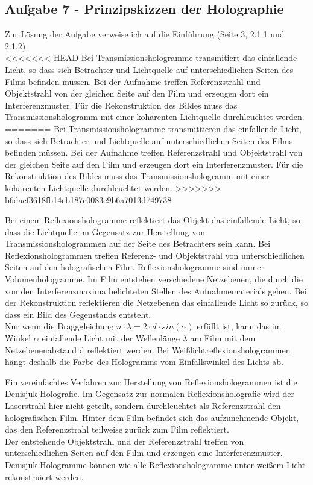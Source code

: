 \subsection*{Aufgabe 7 - Prinzipskizzen der Holographie}
Zur Lösung der Aufgabe verweise ich auf die Einführung (Seite 3, 2.1.1 und 2.1.2). \\
<<<<<<< HEAD
Bei Transmissionshologramme transmitiert das einfallende Licht, so dass sich Betrachter und Lichtquelle auf unterschiedlichen Seiten des Films befinden müssen. Bei der Aufnahme treffen Referenzstrahl und Objektstrahl von der gleichen Seite auf den Film und erzeugen dort ein Interferenzmuster. Für die Rekonstruktion des Bildes muss das Transmissionshologramm mit einer kohärenten Lichtquelle durchleuchtet werden.
=======
Bei Transmissionshologramme transmittieren das einfallende Licht, so dass sich Betrachter und Lichtquelle auf unterschiedlichen Seiten des Films befinden müssen. Bei der Aufnahme treffen Referenzstrahl und Objektstrahl von der gleichen Seite auf den Film und erzeugen dort ein Interferenzmuster. Für die Rekonstruktion des Bildes muss das Transmissionshologramm mit einer kohärenten Lichtquelle durchleuchtet werden.
>>>>>>> b6dacf3618fb14eb187c0083e9b6a7013d749738


Bei einem Reflexionshologramme reflektiert das Objekt das einfallende Licht, so dass die Lichtquelle im Gegensatz zur Herstellung von Transmissionshologrammen auf der Seite des Betrachters sein kann. Bei Reflexionshologrammen treffen Referenz- und Objektstrahl von unterschiedlichen Seiten auf den holografischen Film. Reflexionshologramme sind immer Volumenhologramme. Im Film entstehen verschiedene Netzebenen, die durch die von den Interferenzmaxima belichteten Stellen des Aufnahmematerials gehen. Bei der Rekonstruktion reflektieren die Netzebenen das einfallende Licht so zurück, so dass ein Bild des Gegenstands entsteht.\\
Nur wenn die Bragggleichung $n \cdot \lambda = 2 \cdot d \cdot sin \left( \alpha \right)$ erfüllt ist, kann das im Winkel $\alpha$ einfallende Licht mit der Wellenlänge $\lambda$ am Film mit dem Netzebenenabstand d reflektiert werden. Bei Weißlichtreflexionshologrammen hängt deshalb die Farbe des Hologramms vom Einfallswinkel des Lichts ab.


Ein vereinfachtes Verfahren zur Herstellung von Reflexionshologrammen ist die Denisjuk-Holografie. Im Gegensatz zur normalen Reflexionsholografie wird der Laserstrahl hier nicht geteilt, sondern durchleuchtet als Referenzstrahl den holografischen Film.
Hinter dem Film befindet sich das aufzunehmende Objekt, das den Referenzstrahl teilweise zurück zum Film reflektiert.\\
Der entstehende Objektstrahl und der Referenzstrahl treffen von unterschiedlichen Seiten auf den Film und erzeugen eine Interferenzmuster. Denisjuk-Hologramme können wie alle Reflexionshologramme unter weißem Licht rekonstruiert werden.

